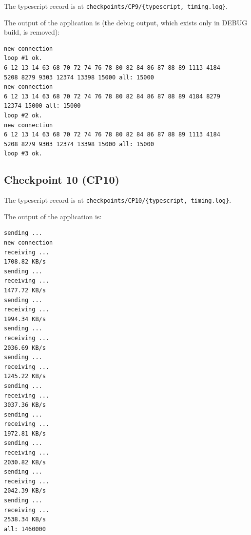 \documentclass[a4paper]{article}
\begin{document}
  The typescript record is at \texttt{checkpoints/CP9/\{typescript, timing.log\}}.

  The output of the application is (the debug output, which exists only in DEBUG build, is removed):
  \begin{verbatim}
new connection
loop #1 ok.
6 12 13 14 63 68 70 72 74 76 78 80 82 84 86 87 88 89 1113 4184
5208 8279 9303 12374 13398 15000 all: 15000
new connection
6 12 13 14 63 68 70 72 74 76 78 80 82 84 86 87 88 89 4184 8279
12374 15000 all: 15000
loop #2 ok.
new connection
6 12 13 14 63 68 70 72 74 76 78 80 82 84 86 87 88 89 1113 4184
5208 8279 9303 12374 13398 15000 all: 15000
loop #3 ok.
  \end{verbatim}

  \subsection{Checkpoint 10 (CP10)}

  The typescript record is at \texttt{checkpoints/CP10/\{typescript, timing.log\}}.

  The output of the application is:
  \begin{verbatim}
sending ...
new connection
receiving ...
1708.82 KB/s
sending ...
receiving ...
1477.72 KB/s
sending ...
receiving ...
1994.34 KB/s
sending ...
receiving ...
2036.69 KB/s
sending ...
receiving ...
1245.22 KB/s
sending ...
receiving ...
3037.36 KB/s
sending ...
receiving ...
1972.81 KB/s
sending ...
receiving ...
2030.82 KB/s
sending ...
receiving ...
2042.39 KB/s
sending ...
receiving ...
2538.34 KB/s
all: 1460000
  \end{verbatim}
\end{document}
